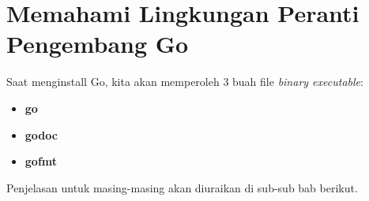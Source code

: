 



\section{Memahami Lingkungan Peranti Pengembang Go}

Saat menginstall Go, kita akan memperoleh 3 buah file \textit{binary executable}:
\begin{itemize}
	\item \textbf{go}
	\item \textbf{godoc}
	\item \textbf{gofmt}
\end{itemize}

Penjelasan untuk masing-masing akan diuraikan di sub-sub bab berikut.

